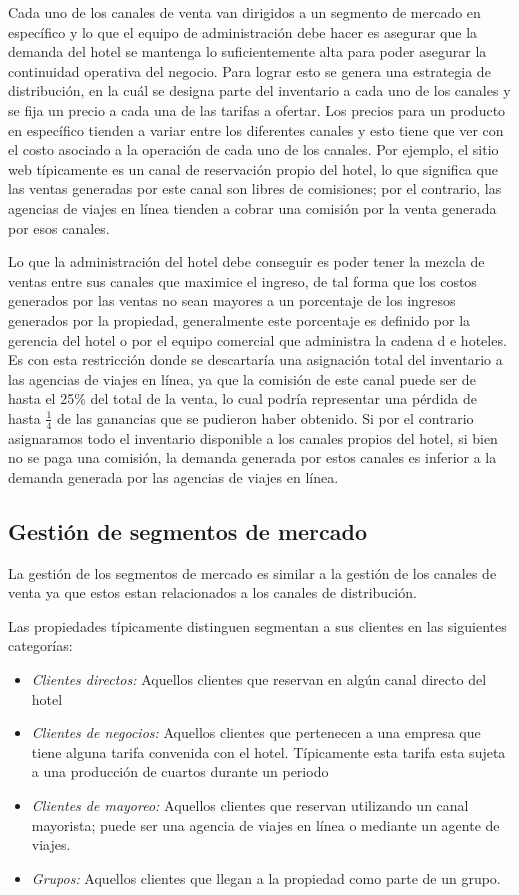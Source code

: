 Cada uno de los canales de venta van dirigidos a un segmento de mercado en específico y lo que el equipo de administración debe hacer es asegurar que la demanda del hotel se mantenga lo suficientemente alta para poder asegurar la continuidad operativa del negocio. Para lograr esto se genera una estrategia de distribución, en la cuál se designa parte del inventario a cada uno de los canales y se fija un precio a cada una de las tarifas a ofertar. Los precios para un producto en específico tienden a variar entre los diferentes canales y esto tiene que ver con el costo asociado a la operación de cada uno de los canales. Por ejemplo, el sitio web típicamente es un canal de reservación propio del hotel, lo que significa que las ventas generadas por este canal son libres de comisiones; por el contrario, las agencias de viajes en línea tienden a cobrar una comisión por la venta generada por esos canales.

Lo que la administración del hotel debe conseguir es poder tener la mezcla de ventas entre sus canales que maximice el ingreso, de tal forma que los costos generados por las ventas no sean mayores a un porcentaje de los ingresos generados por la propiedad, generalmente este porcentaje es definido por la gerencia del hotel o por el equipo comercial que administra la cadena d e hoteles. Es con esta restricción donde se descartaría una asignación total del inventario a las agencias de viajes en línea, ya que la comisión de este canal puede ser de hasta el 25\% del total de la venta, lo cual podría representar una pérdida de hasta $\frac{1}{4}$ de las ganancias que se pudieron haber obtenido. Si por el contrario asignaramos todo el inventario disponible a los canales propios del hotel, si bien no se paga una comisión, la demanda generada por estos canales es inferior a la demanda generada por las agencias de viajes en línea.

\subsection*{Gestión de segmentos de mercado}

La gestión de los segmentos de mercado es similar a la gestión de los canales de venta ya que estos estan relacionados a los canales de distribución. 

Las propiedades típicamente distinguen segmentan a sus clientes en las siguientes categorías:

\begin{itemize}
  \item \emph{Clientes directos:} Aquellos clientes que reservan en algún canal directo del hotel
  \item \emph{Clientes de negocios:} Aquellos clientes que pertenecen a una empresa que tiene alguna tarifa convenida con el hotel. Típicamente esta tarifa esta sujeta a una producción de cuartos durante un periodo
  \item \emph{Clientes de mayoreo:} Aquellos clientes que reservan utilizando un canal mayorista; puede ser una agencia de viajes en línea o mediante un agente de viajes.
  \item \emph{Grupos:} Aquellos clientes que llegan a la propiedad como parte de un grupo.
\end{itemize}


